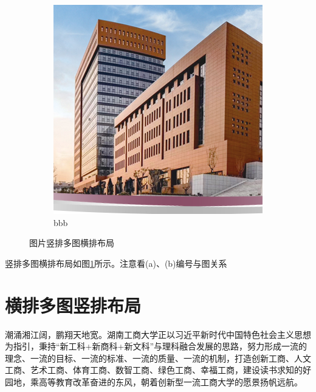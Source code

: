 \begin{figure}[!htb]
\begin{subfigure}[t]{0.13\linewidth}
\begin{minipage}[b]{1\linewidth}
        \includegraphics[width=1\linewidth]{hutb_building.png}
        \caption{bbb}
        \end{minipage}
    \end{subfigure}
    \caption{图片竖排多图横排布局}
    \label{f.csu_col_row}
\end{figure}

竖排多图横排布局如图\ref{f.csu_col_row}所示。注意看(a)、(b)编号与图关系


\section{横排多图竖排布局}

潮涌湘江阔，鹏翔天地宽。湖南工商大学正以习近平新时代中国特色社会主义思想为指引，秉持“新工科+新商科+新文科”与理科融合发展的思路，努力形成一流的理念、一流的目标、一流的标准、一流的质量、一流的机制，打造创新工商、人文工商、艺术工商、体育工商、数智工商、绿色工商、幸福工商，建设读书求知的好园地，乘高等教育改革奋进的东风，朝着创新型一流工商大学的愿景扬帆远航。

